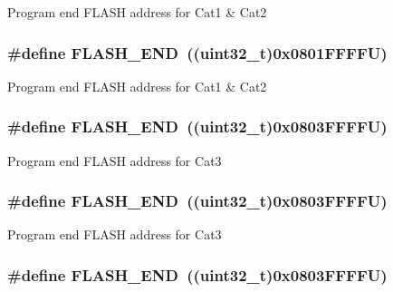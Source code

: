 Program end F\-L\-A\-S\-H address for Cat1 \& Cat2 \hypertarget{group___peripheral__memory__map_ga8be554f354e5aa65370f6db63d4f3ee4}{
\subsubsection[{F\-L\-A\-S\-H\-\_\-\-E\-N\-D}]{\setlength{\rightskip}{0pt plus 5cm}\#define F\-L\-A\-S\-H\-\_\-\-E\-N\-D~((uint32\-\_\-t)0x0801\-F\-F\-F\-F\-U)}}\label{group___peripheral__memory__map_ga8be554f354e5aa65370f6db63d4f3ee4}
Program end F\-L\-A\-S\-H address for Cat1 \& Cat2 \hypertarget{group___peripheral__memory__map_ga8be554f354e5aa65370f6db63d4f3ee4}{
\subsubsection[{F\-L\-A\-S\-H\-\_\-\-E\-N\-D}]{\setlength{\rightskip}{0pt plus 5cm}\#define F\-L\-A\-S\-H\-\_\-\-E\-N\-D~((uint32\-\_\-t)0x0803\-F\-F\-F\-F\-U)}}\label{group___peripheral__memory__map_ga8be554f354e5aa65370f6db63d4f3ee4}
Program end F\-L\-A\-S\-H address for Cat3 \hypertarget{group___peripheral__memory__map_ga8be554f354e5aa65370f6db63d4f3ee4}{
\subsubsection[{F\-L\-A\-S\-H\-\_\-\-E\-N\-D}]{\setlength{\rightskip}{0pt plus 5cm}\#define F\-L\-A\-S\-H\-\_\-\-E\-N\-D~((uint32\-\_\-t)0x0803\-F\-F\-F\-F\-U)}}\label{group___peripheral__memory__map_ga8be554f354e5aa65370f6db63d4f3ee4}
Program end F\-L\-A\-S\-H address for Cat3 \hypertarget{group___peripheral__memory__map_ga8be554f354e5aa65370f6db63d4f3ee4}{
\subsubsection[{F\-L\-A\-S\-H\-\_\-\-E\-N\-D}]{\setlength{\rightskip}{0pt plus 5cm}\#define F\-L\-A\-S\-H\-\_\-\-E\-N\-D~((uint32\-\_\-t)0x0803\-F\-F\-F\-F\-U)}}\label{group___peripheral__memory__map_ga8be554f354e5aa65370f6db63d4f3ee4}
